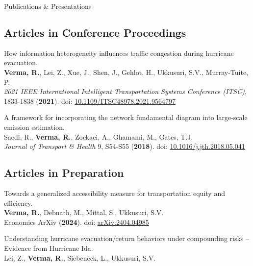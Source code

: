 \documentclass{CV} %
\begin{document}
\begin{rSection}{Publications \& Presentations}
    \subsection*{Articles in Conference Proceedings}
    \begin{etaremune}
        \item How information heterogeneity influences traffic congestion during hurricane evacuation.
        \\ \textbf{Verma, R.}, Lei, Z., Xue, J., Shen, J., Gehlot, H., Ukkusuri, S.V., Murray-Tuite, P.
        \\ \textit{2021 IEEE International Intelligent Transportation Systems Conference (ITSC)}, 1833-1838 (\textbf{2021}). doi: \href{https://ieeexplore.ieee.org/document/9564797}{10.1109/ITSC48978.2021.9564797}

        \item A framework for incorporating the network fundamental diagram into large-scale emission estimation.
        \\ Saedi, R., \textbf{Verma, R.}, Zockaei, A., Ghamami, M., Gates, T.J.
        \\ \textit{Journal of Transport \& Health} 9, S54-S55 (\textbf{2018}). doi: \href{https://www.sciencedirect.com/science/article/abs/pii/S2214140518302263}{10.1016/j.jth.2018.05.041}
    \end{etaremune}
    
    \subsection*{Articles in Preparation}
    \begin{etaremune}
        \item Towards a generalized accessibility measure for transportation equity and efficiency.
        \\ \textbf{Verma, R.}, Debnath, M., Mittal, S., Ukkusuri, S.V.
        \\ Economics ArXiv (\textbf{2024}). doi: \href{https://arxiv.org/abs/2404.04985}{arXiv:2404.04985}

        \item Understanding hurricane evacuation/return behaviors under compounding risks – Evidence from Hurricane Ida.
        \\ Lei, Z., \textbf{Verma, R.}, Siebeneck, L., Ukkusuri, S.V.
        

\end{etaremune}
\end{rSection}
\end{document}
